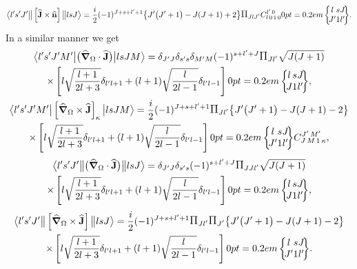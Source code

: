 \begin{equation*}
\braOketred{ l^{\prime} s^{\prime} J^{\prime}}{\left[ \widehat{\vect{J}} \times \widehat{\vect{n}}\right]}{l s J}
=\frac{i}{2}(-1)^{J+s+l^{\prime}+1}\bigl\{J^{\prime}\bigl(J^{\prime}+1\bigr)-J(J+1)+2\bigr\} \Fact{J l J^{\prime}} 
\clebsch{l}{0}{1}{0}{l^{\prime}}{0}
\sixj{l}{s}{J}{J^{\prime}}{1}{l^{\prime}}.
\end{equation*}
In a similar manner we get
\begin{gather}
\braOket{ l^{\prime} s^{\prime} J^{\prime} M^{\prime}}{\bigl(\delop_{\Omega} \cdot \widehat{\vect{J}}\bigr)}{l s J M}=\delta_{J^{\prime} J} \delta_{s^{\prime} s} \delta_{M^{\prime} M}(-1)^{s+l^{\prime}+J} \Fact{J l^\prime} \sqrt{ J(J+1)}\notag \\
\times\left[l \sqrt{\frac{l+1}{2 l+3}} \delta_{l^{\prime} l+1}+(l+1) \sqrt{\frac{l}{2 l-1}} \delta_{l^{\prime} l-1}\right]
\sixj{l}{s}{J}{J}{1}{l^{\prime}},  \label{eq:13:2:155}\\
\braOket{ l^{\prime} s^{\prime} J^{\prime} M^{\prime}}{\left[\delop_{\Omega} \times \widehat{\vect{J}}\right]_{\kappa}}{l s J M}=\frac{i}{2}(-1)^{J+s+l^{\prime}+1}\Fact{J l^\prime} \bigl\{J^{\prime}\bigl(J^{\prime}+1\bigr)-J(J+1)-2\bigr\} \notag\\
\times\left[l \sqrt{\frac{l+1}{2 l+3}} \delta_{l^{\prime} l+1}+(l+1) \sqrt{\frac{l}{2 l-1}} \delta_{l^{\prime} l-1}\right]
\sixj{l}{s}{J}{J^{\prime}}{1}{l^{\prime}} 
\clebsch{J}{M}{1}{\kappa}{J^{\prime}}{M^{\prime}} , \label{eq:13:2:156}
\end{gather}
\begin{multline*}
\braOketred{ l^{\prime} s^{\prime} J^{\prime}}{\bigl(\delop_{\Omega} \cdot \widehat{\vect{J}}\bigr)}{l s J}=\delta_{J^{\prime} J} \delta_{s^{\prime} s}(-1)^{s+l^{\prime}+J} \Fact{J J l^\prime} \sqrt{ J(J+1)} \\
\times\left[l \sqrt{\frac{l+1}{2 l+3}} \delta_{l^{\prime} l+1}+(l+1) \sqrt{\frac{l}{2 l-1}} \delta_{l^{\prime} l-1}\right]
\sixj{l}{s}{J}{J}{1}{l^{\prime}},
\end{multline*}
\begin{multline*}
\braOketred{ l^{\prime} s^{\prime} J^{\prime}}{\left[\delop_{\Omega} \times \widehat{\vect{J}}\right]}{l s J}=\frac{i}{2}(-1)^{J+s+l^{\prime}+1}\Fact{J l^\prime}\Fact{J^{\prime}} \bigl\{J^{\prime}\bigl(J^{\prime}+1\bigr)-J(J+1)-2\bigr\} \\
\times\left[l \sqrt{\frac{l+1}{2 l+3}} \delta_{l^{\prime} l+1}+(l+1) \sqrt{\frac{l}{2 l-1}} \delta_{l^{\prime} l-1}\right]
\sixj{l}{s}{J}{J^{\prime}}{1}{l^{\prime}}.
\end{multline*}
